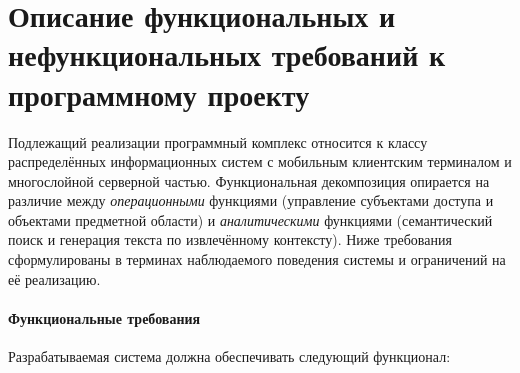 \documentclass{article}
\begin{document}
\section{Описание функциональных и нефункциональных требований к программному проекту}

Подлежащий реализации программный комплекс относится к классу распределённых информационных систем с мобильным клиентским терминалом и многослойной серверной частью. Функциональная декомпозиция опирается на различие между \emph{операционными} функциями (управление субъектами доступа и объектами предметной области) и \emph{аналитическими} функциями (семантический поиск и генерация текста по извлечённому контексту). Ниже требования сформулированы в терминах наблюдаемого поведения системы и ограничений на её реализацию.

\paragraph{Функциональные требования}

Разрабатываемая система должна обеспечивать следующий функционал:
\end{document}

